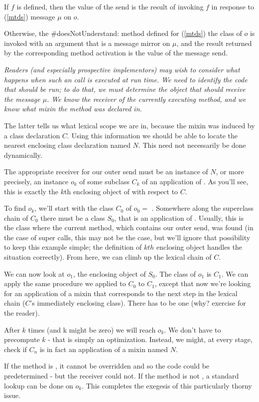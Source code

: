 \documentclass{article}
\newcommand{\code}[1]{{\sf #1}}
\begin{document}
If $f$ is defined, then the value of the send is the result of invoking $f$ in response to (\ref{mtds}) message $\mu$ on $o$. 


Otherwise, the \code{\#doesNotUnderstand:} method  defined for (\ref{mtds}) the class of $o$ is invoked
with an argument that is a message mirror on $\mu$, and the result  returned by the corresponding method activation is the value of the message send.

{\it
Readers (and especially prospective implementors) may wish to consider what happens when such an \OUTER{} call is executed at run time.  We need to identify the code that should be run; to do that, we must determine the object that should receive the message $\mu$. We know the receiver of the currently executing method, and we know what mixin the method was declared in. 

The latter tells us what lexical scope we are in, because the mixin was induced by a class declaration $C$. Using this information we should be able to locate the nearest enclosing class declaration named $N$. This need not necessarily be done dynamically.

The appropriate receiver for our outer send  must be an instance of $N$, or more precisely, an instance $o_k$ of some subclass $C_k$ of an application of . As you'll see, this is exactly the $k$th enclosing object of \SELF{}  with respect to $C$.

To find $o_k$, we'll start with the class $C_0$ of $o_0 = $ \SELF{}. Somewhere along the superclass chain of $C_0$  there must be a class $S_0$, that is an application of .  Usually, this is the class where the current method, which contains our outer send, was found (in the case of super calls, this may not be the case, but we'll ignore that possibility to keep this example simple; the definition of $kth$ enclosing object handles the situation correctly). From here, we can climb up the lexical chain of $C$.


We can now look at $o_1$, the enclosing object of $S_0$. The class of $o_1$ is $C_1$. We can apply the same procedure we applied to $C_0$ to $C_1$, except that now we're looking for an application of a mixin that corresponds to the next step in the lexical chain ($C$'s immediately enclosing class). There has to be one (why? exercise for the reader).

After $k$ times (and k might be zero) we will reach $o_k$. We don't have to precompute $k$ - that is simply an optimization. Instead, we might, at every stage, check if $C_n$ is in fact an application of a mixin named $N$.

If the method is \PRIVATE{},
it cannot be overridden and so the code could be predetermined - but the receiver could not. If the method is not \PRIVATE, a standard lookup can be done on $o_k$.  This completes the exegesis of this particularly thorny issue.
}
\end{document}

